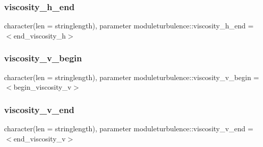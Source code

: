 \subsubsection{\texorpdfstring{viscosity\+\_\+h\+\_\+end}{viscosity\_h\_end}}
{\footnotesize\ttfamily character(len = stringlength), parameter moduleturbulence\+::viscosity\+\_\+h\+\_\+end = \textquotesingle{}$<$end\+\_\+viscosity\+\_\+h$>$\textquotesingle{}\hspace{0.3cm}{\ttfamily [private]}}

\mbox{\label{namespacemoduleturbulence_aa207229e0ff82c7ac123a9b078a51f6a}} 
\subsubsection{\texorpdfstring{viscosity\+\_\+v\+\_\+begin}{viscosity\_v\_begin}}
{\footnotesize\ttfamily character(len = stringlength), parameter moduleturbulence\+::viscosity\+\_\+v\+\_\+begin = \textquotesingle{}$<$begin\+\_\+viscosity\+\_\+v$>$\textquotesingle{}\hspace{0.3cm}{\ttfamily [private]}}

\mbox{\label{namespacemoduleturbulence_a2b0fb2fa55418700724ffc5e0f294858}} 
\subsubsection{\texorpdfstring{viscosity\+\_\+v\+\_\+end}{viscosity\_v\_end}}
{\footnotesize\ttfamily character(len = stringlength), parameter moduleturbulence\+::viscosity\+\_\+v\+\_\+end = \textquotesingle{}$<$end\+\_\+viscosity\+\_\+v$>$\textquotesingle{}\hspace{0.3cm}{\ttfamily [private]}}

